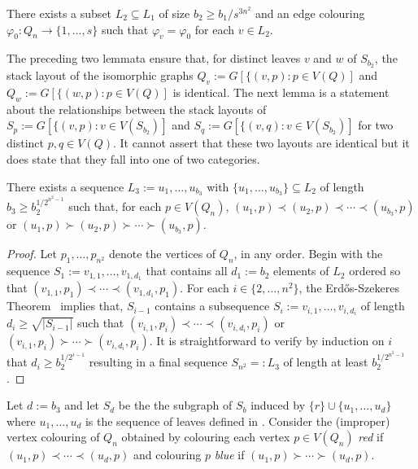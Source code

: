 \documentclass[kpfonts]{patmorin}
\renewcommand{\ge}{\geqslant}
\begin{document}
\begin{lem}
    There exists a subset $L_2\subseteq L_1$ of size $b_2\ge b_1/s^{3n^2}$
    and an edge colouring $\varphi_0:Q_n\to\{1,\ldots,s\}$ such that $\varphi_v=\varphi_0$ for each $v\in L_2$.
\end{lem}

The preceding two lemmata ensure that, for distinct leaves $v$ and $w$ of $S_{b_2}$, the stack layout of the isomorphic graphs $Q_v:=G[\{(v,p):p\in V(Q)]$ and $Q_w:=G[\{(w,p):p\in V(Q)]$ is identical.  The next lemma is a statement about the relationships between the stack layouts of $S_p:=G[\{(v,p):v\in V(S_{b_2})]$ and $S_q:=G[\{(v,q):v\in V(S_{b_2})]$ for two distinct $p,q\in V(Q)$.  It cannot assert that these two layouts are identical but it does state that they fall into one of two categories.

\begin{lem}
    There exists a sequence $L_3:=u_1,\ldots,u_{b_3}$ with $\{u_1,\ldots,u_{b_3}\}\subseteq L_2$ of length $b_3\ge b_2^{1/2^{n^2-1}}$ such that, for each $p\in V(Q_n)$, $(u_1,p)\prec (u_2,p)\prec\cdots\prec (u_{b_3},p)$ or $(u_1,p)\succ (u_2,p)\succ\cdots\succ (u_{b_3},p)$.
\end{lem}

\begin{proof}
    Let $p_1,\ldots,p_{n^2}$ denote the vertices of $Q_n$, in any order.
    Begin with the sequence $S_1:=v_{1,1},\ldots,v_{1,d_1}$ that contains all $d_1:=b_2$ elements of $L_2$ ordered so that $(v_{1,1},p_1)\prec\cdots\prec(v_{1,d_1},p_1)$.  For each $i\in\{2,\ldots,n^2\}$, the Erd\H{o}s-Szekeres Theorem~\citep{ES35} implies that, $S_{i-1}$ contains a subsequence $S_i:=v_{i,1},\ldots,v_{i,d_i}$ of length $d_i\ge \sqrt{|S_{i-1}|}$ such that $(v_{i,1},p_i)\prec\cdots\prec(v_{i,d_i},p_i)$ or $(v_{i,1},p_i)\succ\cdots\succ(v_{i,d_i},p_i)$.  It is straightforward to verify by induction on $i$ that $d_i \ge b_2^{1/2^{i-1}}$ resulting in a final sequence $S_{n^2}=:L_3$ of length at least $b_2^{1/2^{n^2-1}}$.
\end{proof}

Let $d:=b_3$ and let $S_d$ be the the subgraph of $S_b$ induced by $\{r\}\cup\{u_1,\ldots,u_{d}\}$ where $u_1,\ldots,u_d$ is the sequence of leaves defined in .  Consider the (improper) vertex colouring of $Q_n$ obtained by colouring each vertex $p\in V(Q_n)$ \emph{red} if $(u_1,p)\prec\cdots\prec (u_d,p)$ and colouring $p$ \emph{blue} if $(u_1,p)\succ\cdots\succ(u_d,p)$.
\end{document}
